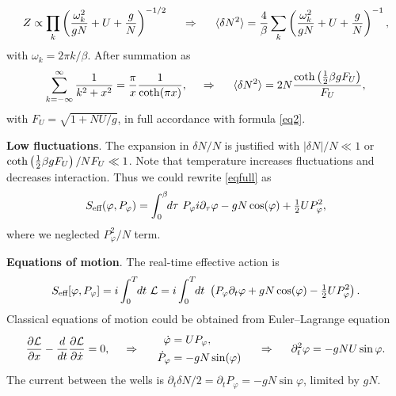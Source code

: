 \begin{equation*}
	Z \propto \prod_{k}^{} \left(
		\frac{\omega_k^2}{gN} + U + \frac{g}{N}
	\right)^{-1/2}
	\hspace{0.5cm} \Rightarrow \hspace{0.5cm}
	\langle \delta N^2\rangle = \frac{4}{\beta} \sum_k \left(\frac{\omega_k^2}{gN} + U + \frac{g}{N}\right)^{-1},
\end{equation*}
with $\omega_k = 2 \pi k / \beta $. After summation as
\begin{equation*}
	\sum_{k=-\infty}^{\infty} \frac{1}{k^2 + x^2} = \frac{\pi}{x} \frac{1}{\mathop{\mathrm{coth}}\nolimits (\pi x)},
	\hspace{0.5cm} \Rightarrow \hspace{0.5cm}
	\langle \delta N^2\rangle = 2 N \frac{\mathop{\mathrm{coth}}\nolimits \left(\tfrac{1}{2} \beta g F_U \right)}{F_U},
\end{equation*}
with $F_U = \sqrt{1 + NU/g}$, in full accordance with formula \eqref{eq2}.



\textbf{Low fluctuations}. The expansion in $\delta N / N$ is
justified with  $|\delta N| / N \ll 1$ or $\mathop{\mathrm{coth}}\nolimits \left(\tfrac{1}{2} \beta g F_U \right) / N F_U \ll 1$. Note that temperature increases fluctuations and decreases interaction. Thus  we could rewrite \eqref{eqfull} as
\begin{equation*}
	S_{\textnormal{eff}}(\varphi, P_\varphi) = \int_{0}^{\beta} \hspace{-1mm} d \tau\  P_\varphi i \partial_\tau \varphi - g N \cos(\varphi) + \tfrac{1}{2} U P_\varphi^2,
\end{equation*}
where we neglected $P_\varphi^2 / N$ term. 


\textbf{Equations of motion}. The real-time effective action is
\begin{equation*}
	S_{\textnormal{eff}}[\varphi, P_\varphi] = i \int_{0}^{T} \hspace{-1mm} d t\ \mathcal{L} = i \int_{0}^{T} \hspace{-1mm} d t\  \left(P_\varphi \partial_t \varphi + g N \cos (\varphi) - \tfrac{1}{2} U P_\varphi^2\right).
\end{equation*}
Classical equations of motion could be obtained from Euler–Lagrange equation
\begin{equation*}
	\frac{\partial \mathcal{L}}{\partial x} - \frac{d }{d t} \frac{\partial \mathcal{L}}{\partial \dot{x}} = 0,
	\hspace{0.5cm} \Rightarrow \hspace{0.5cm}
	\left.\begin{aligned}
	    \dot{\varphi} &= U P_\varphi, \\
	    \dot{P}_\varphi &= - g N \sin(\varphi)
	\end{aligned}\right.
	\hspace{0.5cm} \Rightarrow \hspace{0.5cm}
	\partial_t^2 \varphi = - g N U \sin \varphi.
\end{equation*}
The current between the wells is $\partial_t \delta N / 2 = \partial_t P_\varphi = - g N \sin \varphi$, limited by $g N$.


